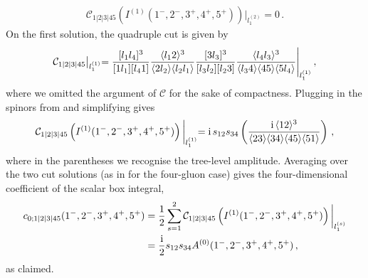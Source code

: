 \begin{enumerate}[a)]
\begin{align}
 \mathcal{C}_{1|2|3|45}\left( I^{(1)}(1^-,2^-,3^+,4^+,5^+) \right) \biggl|_{l_1^{(2)}}  = 0 \,.
\end{align}
%
On the first solution, the quadruple cut is given by
\begin{align}
 \mathcal{C}_{1|2|3|45} \bigl|_{l_1^{(1)}}  = 
\frac{[ l_1 l_4 ]^3}{[ 1 l_1 ] [ l_4 1 ]} \frac{\langle l_1 2 \rangle^3}{\langle 2 l_2 \rangle \langle l_2 l_1 \rangle}
  \frac{[ 3 l_3 ]^3}{[ l_3 l_2 ] [ l_2 3 ]} \frac{\langle l_4 l_3 \rangle^3}{\langle l_3 4 \rangle \langle 4 5 \rangle \langle 5 l_4 \rangle } \Biggl|_{l_1^{(1)}} \,,
\end{align}
where we omitted the argument of $\mathcal{C}$ for the sake of compactness. Plugging in the spinors from  and simplifying gives
\begin{align}
 \mathcal{C}_{1|2|3|45}\left( I^{(1)}(1^-,2^-,3^+,4^+,5^+) \right) \biggl|_{l_1^{(1)}}  = \mathrm{i} \, s_{12} s_{34} \left( \frac{\mathrm{i} \, \langle 1 2 \rangle^3}{\langle 2 3 \rangle \langle 3 4 \rangle \langle 4 5 \rangle \langle 5 1 \rangle} \right) \,,
\end{align}
where in the parentheses we recognise the tree-level amplitude. Averaging over the two cut solutions 
(as in  for the four-gluon case) gives the four-dimensional coefficient of the scalar box integral,
\begin{align}
c_{0;1|2|3|45}(1^-,2^-,3^+,4^+,5^+)  & = \frac{1}{2} \sum_{s=1}^2  \mathcal{C}_{1|2|3|45}\left( I^{(1)}(1^-,2^-,3^+,4^+,5^+) \right) \biggl|_{l_1^{(s)}} \nonumber \\
& = \frac{\mathrm{i}}{2} s_{12} s_{34} A^{(0)}(1^-,2^-,3^+,4^+,5^+) \,,
\end{align}
as claimed.

\smallskip


\end{enumerate}
